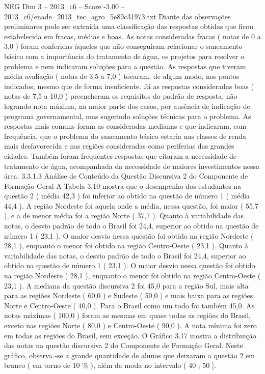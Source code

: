\begin{textsample}{NEG Dim 3 – 2013\_c6 – Score -3.00 – 2013\_c6/enade\_2013\_tec\_agro\_5e89c31973.txt}
Diante das observações preliminares pode ser extraída uma classificação das respostas obtidas que ficou estabelecida em fracas, médias e boas.
As notas consideradas fracas ( notas de 0 a 3,0 ) foram conferidas àqueles que não conseguiram relacionar o saneamento básico com a importância do tratamento de água, os projetos para resolver o problema e nem indicaram soluções para a questão.
As respostas que tiveram média avaliação ( notas de 3,5 a 7,0 ) tocaram, de algum modo, nos pontos indicados, mesmo que de forma insuficiente.
Já as respostas consideradas boas ( notas de 7,5 a 10,0 ) preencheram os requisitos do padrão de resposta, não logrando nota máxima, na maior parte dos casos, por ausência de indicação de programa governamental, mas sugerindo soluções técnicas para o problema.
As respostas mais comuns foram as consideradas medianas e que indicaram, com frequência, que o problema do saneamento básico estaria nas classes de renda mais desfavorecida e nas regiões consideradas como periferias das grandes cidades.
Também foram frequentes respostas que citaram a necessidade de tratamento de água, acompanhada da necessidade de maiores investimentos nessa área. 3.3.1.3 Análise de Conteúdo da Questão Discursiva 2 do Componente de Formação Geral A Tabela 3.10 mostra que o desempenho dos estudantes na questão 2 ( média 42,3 ) foi inferior ao obtido na questão de número 1 ( média 44,4 ).
A região Nordeste foi aquela onde a média, nessa questão, foi maior ( 55,7 ), e a de menor média foi a região Norte ( 37,7 ).
Quanto à variabilidade das notas, o desvio padrão de todo o Brasil foi 24,4, superior ao obtido na questão de número 1 ( 23,1 ).
O maior desvio nessa questão foi obtido na região Nordeste ( 28,1 ), enquanto o menor foi obtido na região Centro-Oeste ( 23,1 ).
Quanto à variabilidade das notas, o desvio padrão de todo o Brasil foi 24,4, superior ao obtido na questão de número 1 ( 23,1 ).
O maior desvio nessa questão foi obtido na região Nordeste ( 28,1 ), enquanto o menor foi obtido na região Centro-Oeste ( 23,1 ).
A mediana da questão discursiva 2 foi 45,0 para a região Sul, mais alta para as regiões Nordeste ( 60,0 ) e Sudeste ( 50,0 ) e mais baixa para as regiões Norte e Centro-Oeste ( 40,0 ).
Para o Brasil como um todo foi também 45,0.
As notas máximas ( 100,0 ) foram as mesmas em quase todas as regiões do Brasil, exceto nas regiões Norte ( 80,0 ) e Centro-Oeste ( 90,0 ).
A nota mínima foi zero em todas as regiões do Brasil, sem exceção.
O Gráfico 3.17 mostra a distribuição das notas na questão discursiva 2 do Componente de Formação Geral.
Neste gráfico, observa -se a grande quantidade de alunos que deixaram a questão 2 em branco ( em torno de 10 \% ), além da moda no intervalo ( 40 ; 50 ].

\end{textsample}
